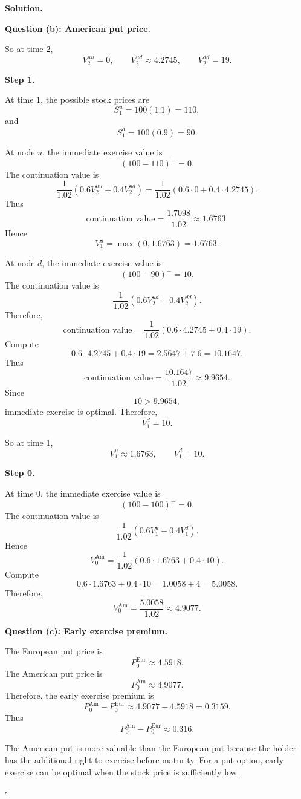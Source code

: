 \documentclass[11pt]{article}
\theoremstyle{plain}
\newcommand{\1}{\mathbf{1}}
\theoremstyle{definition}
\newenvironment{solution}
{\par\medskip\noindent\textbf{Solution.}\par\medskip}
{\hfill$\square$\par\medskip}
\newenvironment{solutionpart}[1]
{\par\medskip\noindent\textbf{#1.}\par\smallskip}
{\par\medskip}
\begin{document}
\begin{solution}
\begin{solutionpart}{Question (b): American put price}
So at time $2$,
\[
\boxed{
V_2^{uu}=0,
\qquad
V_2^{ud}\approx 4.2745,
\qquad
V_2^{dd}=19.
}
\]

\medskip

\noindent\textbf{Step 1.}

At time $1$, the possible stock prices are
\[
S_1^u=100(1.1)=110,
\]
and
\[
S_1^d=100(0.9)=90.
\]

At node $u$, the immediate exercise value is
\[
(100-110)^+=0.
\]
The continuation value is
\[
\frac{1}{1.02}
\left(
0.6V_2^{uu}+0.4V_2^{ud}
\right)
=
\frac{1}{1.02}
\left(
0.6\cdot 0+0.4\cdot 4.2745
\right).
\]
Thus
\[
\text{continuation value}
=
\frac{1.7098}{1.02}
\approx 1.6763.
\]
Hence
\[
V_1^u
=
\max(0,1.6763)
=
1.6763.
\]

At node $d$, the immediate exercise value is
\[
(100-90)^+=10.
\]
The continuation value is
\[
\frac{1}{1.02}
\left(
0.6V_2^{ud}+0.4V_2^{dd}
\right).
\]
Therefore,
\[
\text{continuation value}
=
\frac{1}{1.02}
\left(
0.6\cdot 4.2745+0.4\cdot 19
\right).
\]
Compute
\[
0.6\cdot 4.2745+0.4\cdot 19
=
2.5647+7.6
=
10.1647.
\]
Thus
\[
\text{continuation value}
=
\frac{10.1647}{1.02}
\approx 9.9654.
\]
Since
\[
10>9.9654,
\]
immediate exercise is optimal. Therefore,
\[
V_1^d=10.
\]

So at time $1$,
\[
\boxed{
V_1^u\approx 1.6763,
\qquad
V_1^d=10.
}
\]

\medskip

\noindent\textbf{Step 0.}

At time $0$, the immediate exercise value is
\[
(100-100)^+=0.
\]
The continuation value is
\[
\frac{1}{1.02}
\left(
0.6V_1^u+0.4V_1^d
\right).
\]
Hence
\[
V_0^{\mathrm{Am}}
=
\frac{1}{1.02}
\left(
0.6\cdot 1.6763+0.4\cdot 10
\right).
\]
Compute
\[
0.6\cdot 1.6763+0.4\cdot 10
=
1.0058+4
=
5.0058.
\]
Therefore,
\[
\boxed{
V_0^{\mathrm{Am}}
=
\frac{5.0058}{1.02}
\approx 4.9077.
}
\]
\end{solutionpart}

\begin{solutionpart}{Question (c): Early exercise premium}

The European put price is
\[
P_0^{\mathrm{Eur}}\approx 4.5918.
\]
The American put price is
\[
P_0^{\mathrm{Am}}\approx 4.9077.
\]
Therefore, the early exercise premium is
\[
P_0^{\mathrm{Am}}-P_0^{\mathrm{Eur}}
\approx
4.9077-4.5918
=
0.3159.
\]
Thus
\[
\boxed{
P_0^{\mathrm{Am}}-P_0^{\mathrm{Eur}}
\approx 0.316.
}
\]

The American put is more valuable than the European put because the holder has the additional right to exercise before maturity. For a put option, early exercise can be optimal when the stock price is sufficiently low.
\end{solutionpart}


\end{solution}
\end{document}
